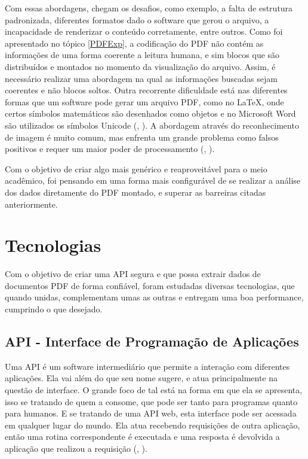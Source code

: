 Com essas abordagens, chegam os desafios, como exemplo, a falta de estrutura padronizada, diferentes formatos dado o software que gerou o arquivo, a incapacidade de renderizar o conteúdo corretamente, entre outros. Como foi apresentado no tópico \ref{PDFExp}, a codificação do PDF não contém as informações de uma forma coerente a leitura humana, e sim blocos que são distribuídos e montados no momento da visualização do arquivo. Assim, é necessário realizar uma abordagem na qual as informações buscadas sejam coerentes e não blocos soltos. Outra  recorrente dificuldade está nas diferentes formas que um software pode gerar um arquivo PDF, como no LaTeX, onde certos símbolos matemáticos são desenhados como objetos e no Microsoft Word são utilizados os símbolos Unicode (\citeauthor{sasirekhatext}, \citeyear{sasirekhatext}). A abordagem através do reconhecimento de imagem é muito comum, mas enfrenta um grande problema como falsos positivos e requer um maior poder de processamento (\citeauthor{ajedig2011pdf}, \citeyear{ajedig2011pdf}).

Com o objetivo de criar algo mais genérico e reaproveitável para o meio acadêmico, foi pensando em uma forma mais configurável de se realizar a análise dos dados diretamente do PDF montado, e superar as barreiras citadas anteriormente.

\section{Tecnologias}
Com o objetivo de criar uma API segura e que possa extrair dados de documentos PDF de forma confiável, foram estudadas diversas tecnologias, que quando unidas, complementam umas as outras e entregam uma boa performance, cumprindo o que desejado.

\subsection{API - Interface de Programação de Aplicações}
Uma API é um software intermediário que permite a interação com diferentes aplicações. Ela vai além do que seu nome sugere, e atua principalmente na questão de interface. O grande foco de tal está na forma em que ela se apresenta, isso se tratando de quem a consome, que pode ser tanto para programas quanto para humanos. E se tratando de uma API web, esta interface pode ser acessada em qualquer lugar do mundo. Ela atua recebendo requisições de outra aplicação, então uma rotina correspondente é executada e uma resposta é devolvida a aplicação que realizou a requisição (\citeauthor{designingapioriley}, \citeyear{designingapioriley}).

